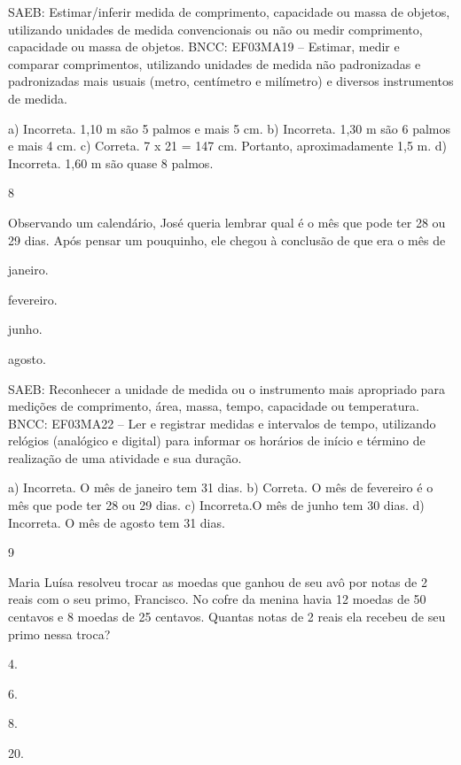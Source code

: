 \begin{multicols}{2}
\begin{enumerate}
{SAEB: Estimar/inferir medida de comprimento, capacidade ou massa de objetos, utilizando unidades de medida convencionais ou não ou medir comprimento, capacidade ou massa de objetos.
BNCC: EF03MA19 -- Estimar, medir e comparar comprimentos, utilizando unidades de medida
não padronizadas e padronizadas mais usuais (metro, centímetro e milímetro) e diversos
instrumentos de medida.

a) Incorreta. 1,10 m são 5 palmos e mais 5 cm.
b) Incorreta. 1,30 m são 6 palmos e mais 4 cm. 
c) Correta. 7 x 21 = 147 cm. Portanto, aproximadamente 1,5 m.
d) Incorreta. 1,60 m são quase 8 palmos.

\num{8}

Observando um calendário, José queria lembrar qual é o mês que pode ter 28 ou 29 dias. Após pensar um pouquinho, ele chegou à conclusão de que era o mês de

\begin{escolha}
\item
  janeiro.
\item
  fevereiro.
\item
  junho.
\item
  agosto.
\end{escolha}

SAEB: Reconhecer a unidade de medida ou o instrumento mais apropriado para medições de comprimento, área, massa, tempo, capacidade ou temperatura.
BNCC: EF03MA22 -- Ler e registrar medidas e intervalos de tempo, utilizando relógios (analógico e
digital) para informar os horários de início e término de realização de uma atividade e sua
duração.

a) Incorreta. O mês de janeiro tem 31 dias.
b) Correta. O mês de fevereiro é o mês que pode ter 28 ou 29 dias.
c) Incorreta.O mês de junho tem 30 dias.
d) Incorreta. O mês de agosto tem 31 dias.

\num{9}

Maria Luísa resolveu trocar as moedas que ganhou de seu avô por notas de
2 reais com o seu primo, Francisco. No cofre da menina havia 12 moedas de 50
centavos e 8 moedas de 25 centavos. Quantas notas de 2 reais ela recebeu
de seu primo nessa troca?

\begin{escolha}
\item
  4.
\item
  6.
\item
  8.
\item
  20.
\end{escolha}

}
\end{enumerate}
\end{multicols}
